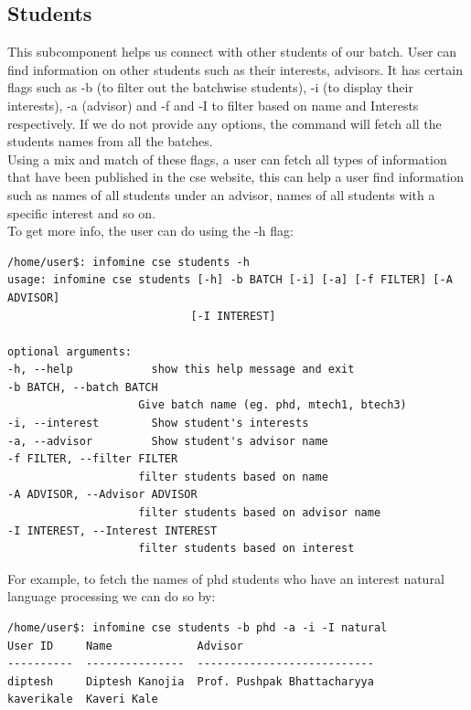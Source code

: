 \documentclass[12pt, a4paper]{article}
\begin{document}
\subsection{Students}
This subcomponent helps us connect with other students of our batch. 
User can find information on other students such as their interests, advisors.
It has certain flags such as -b (to filter out the batchwise students), -i (to display their interests), -a (advisor)
and -f and -I to filter based on name and Interests respectively.
If we do not provide any options, the command will fetch all the students names from all the batches.\\
Using a mix and match of these flags, a user can fetch all types of information
that have been published in the cse website, this can help a user find information such as names of all students
under an advisor, names of all students with a specific interest and so on.\\
To get more info, the user can do using the -h flag:
\begin{verbatim}
/home/user$: infomine cse students -h
usage: infomine cse students [-h] -b BATCH [-i] [-a] [-f FILTER] [-A ADVISOR]
                            [-I INTEREST]

optional arguments:
-h, --help            show this help message and exit
-b BATCH, --batch BATCH
                    Give batch name (eg. phd, mtech1, btech3)
-i, --interest        Show student's interests
-a, --advisor         Show student's advisor name
-f FILTER, --filter FILTER
                    filter students based on name
-A ADVISOR, --Advisor ADVISOR
                    filter students based on advisor name
-I INTEREST, --Interest INTEREST
                    filter students based on interest
\end{verbatim}
For example, to fetch the names of phd students who have an interest natural language processing
we can do so by:\\
\begin{verbatim}
/home/user$: infomine cse students -b phd -a -i -I natural
User ID     Name             Advisor                      
----------  ---------------  ---------------------------  
diptesh     Diptesh Kanojia  Prof. Pushpak Bhattacharyya  
kaverikale  Kaveri Kale                                   
\end{verbatim}
\end{document}
